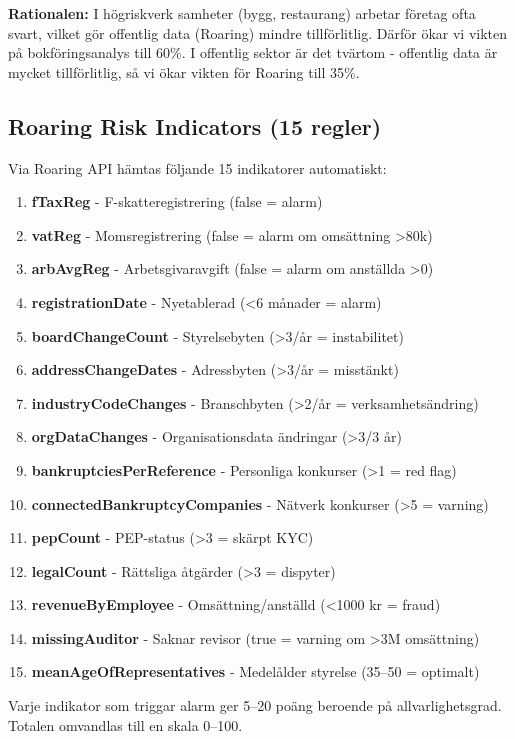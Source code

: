 \documentclass{article}
\begin{document}
\textbf{Rationalen:} I högriskverk samheter (bygg, restaurang) arbetar företag ofta svart, vilket gör offentlig data (Roaring) mindre tillförlitlig. Därför ökar vi vikten på bokföringsanalys till 60\%. I offentlig sektor är det tvärtom - offentlig data är mycket tillförlitlig, så vi ökar vikten för Roaring till 35\%.

\subsection*{Roaring Risk Indicators (15 regler)}

Via Roaring API hämtas följande 15 indikatorer automatiskt:

\begin{enumerate}
\item \textbf{fTaxReg} - F-skatteregistrering (false = alarm)
\item \textbf{vatReg} - Momsregistrering (false = alarm om omsättning >80k)
\item \textbf{arbAvgReg} - Arbetsgivaravgift (false = alarm om anställda >0)
\item \textbf{registrationDate} - Nyetablerad (<6 månader = alarm)
\item \textbf{boardChangeCount} - Styrelsebyten (>3/år = instabilitet)
\item \textbf{addressChangeDates} - Adressbyten (>3/år = misstänkt)
\item \textbf{industryCodeChanges} - Branschbyten (>2/år = verksamhetsändring)
\item \textbf{orgDataChanges} - Organisationsdata ändringar (>3/3 år)
\item \textbf{bankruptciesPerReference} - Personliga konkurser (>1 = red flag)
\item \textbf{connectedBankruptcyCompanies} - Nätverk konkurser (>5 = varning)
\item \textbf{pepCount} - PEP-status (>3 = skärpt KYC)
\item \textbf{legalCount} - Rättsliga åtgärder (>3 = dispyter)
\item \textbf{revenueByEmployee} - Omsättning/anställd (<1000 kr = fraud)
\item \textbf{missingAuditor} - Saknar revisor (true = varning om >3M omsättning)
\item \textbf{meanAgeOfRepresentatives} - Medelålder styrelse (35--50 = optimalt)
\end{enumerate}

Varje indikator som triggar alarm ger 5--20 poäng beroende på allvarlighetsgrad. Totalen omvandlas till en skala 0--100.
\end{document}
